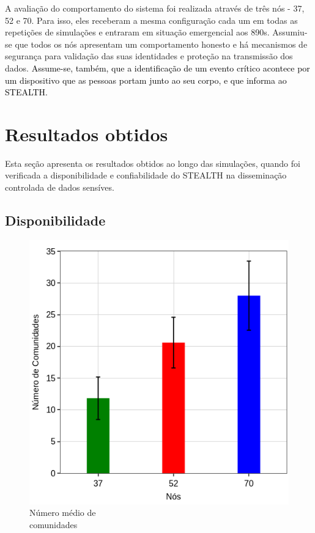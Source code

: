 \documentclass[12pt]{article}
\newcommand{\rev}[1]{\textcolor{black}{{#1}}}
\begin{document}
A avaliação do comportamento do sistema foi realizada através de três nós - 37, 52 e 70. Para isso, eles receberam a mesma configuração cada um em todas as repetições de simulações e
entraram em situação emergencial aos 890s.
Assumiu-se que todos os nós apresentam um comportamento honesto
e há mecanismos de segurança para validação das suas identidades e proteção na transmissão dos dados. \rev{Assume-se, também, que a identificação de um evento crítico 
acontece 
por um dispositivo que as pessoas 
portam 
junto ao seu corpo, e que informa ao \mbox{STEALTH}.}




\section{Resultados obtidos}
\label{sec:results}

Esta seção apresenta os resultados obtidos ao longo das simulações, quando foi verificada a disponibilidade e confiabilidade do \mbox{STEALTH} na disseminação controlada de dados sensíves.

\subsection{Disponibilidade}

\begin{figure}
\centering
\includegraphics[width=.35\textwidth]{figures/coi_mean_performance_3_SBSEG19_v2.png}
\vspace{-0.5cm}
\caption[Número médio de comunidades]
{Número médio de \\ comunidades\endtabular}
\label{fig:coiEstabelecidas}
\end{figure}    
\end{document}

